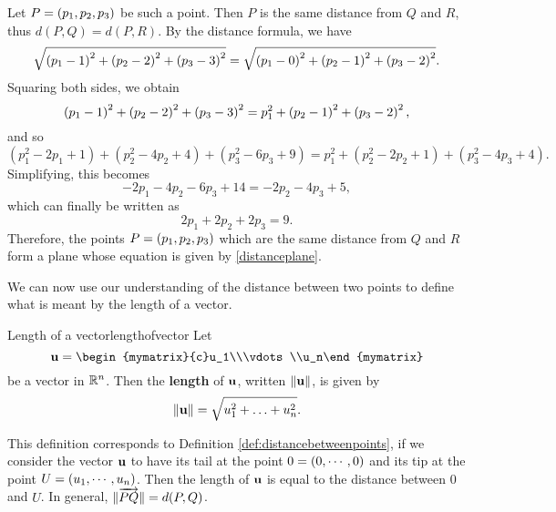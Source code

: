 \begin{solution}
  Let $P = \left(p_1,p_2,p_3\right)$ be such a point. Then $P$ is the same
  distance from $Q$ and $R$, thus $d(P,Q)=d(P,R)$. By the distance
  formula, we have
  \begin{equation*}
    \sqrt{\left(p_1-1\right)^{2}+\left(p_2-2\right)^{2}+\left(p_3-3\right)^{2}}=
    \sqrt{\left(p_1-0\right)^{2}+\left(p_2-1\right)^{2}+\left(p_3-2\right)^{2}}.
  \end{equation*}
  Squaring both sides, we obtain 
  \begin{equation*}
    \left(p_1 -1\right) ^{2}+\left(p_2 -2\right) ^{2}+\left(p_3 -3\right)
    ^{2}=p_1^{2}+\left(p_2-1\right) ^{2}+\left(p_3 -2\right) ^{2},
  \end{equation*}
  and so
  \begin{equation*}
    \allowbreak (p_1^{2}-2p_1+1)+(p_2^{2}-4p_2+4)+(p_3^{2}-6p_3+9)=p_1^{2}+(p_2^{2}-2p_2+1)+(p_3^{2}-4p_3+4).
  \end{equation*}
  Simplifying, this becomes
  \begin{equation*}
    -2p_1-4p_2-6p_3+14=-2p_2-4p_3+5,
  \end{equation*}
  which can finally be written as 
  \begin{equation}\label{distanceplane}
    2p_1+2p_2+2p_3=9.
  \end{equation}
  Therefore, the points $P = \left(p_1,p_2,p_3\right)$ which are the same
  distance from $Q$ and $R$ form a plane whose equation is given by
  \eqref{distanceplane}.
\end{solution}

We can now use our understanding of the distance between two points to
define what is meant by the length of a vector.

\begin{definition}{Length of a vector}{lengthofvector}
  Let
  \[
    \vect{u} = \begin{mymatrix}{c}u_1\\\vdots\\u_n\end{mymatrix}
  \]
  be a vector in $\mathbb{R}^n$. Then the
  \textbf{length} of
  $\mbox{\bf u}$, written $\|\mbox{\bf u}\|$, is given by
  \begin{equation*}
    \|\mbox{\bf u}\| = \sqrt{u_{1}^2 + \ldots + u_{n}^2}.
  \end{equation*}
\end{definition}

This definition corresponds to Definition
\ref{def:distancebetweenpoints}, if we consider the vector $\mbox{\bf u}$
to have its tail at the point $0 = \left(0, \cdots ,0 \right)$ and its tip at
the point $U = \left(u_1, \cdots, u_n \right)$.  Then the length of
$\mbox{\bf u}$ is equal to the distance between $0$ and $U$. In general,
$\|\overrightarrow{PQ}\| = d(P,Q)$.

